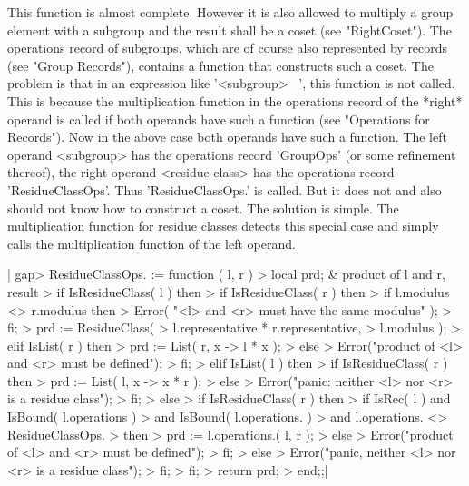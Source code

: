 This function is almost complete.  However it is also allowed to multiply
a group element  with a subgroup  and the result shall  be  a coset  (see
"RightCoset").  The operations  record  of subgroups, which are of course
also represented by records  (see "Group Records"),  contains  a function
that constructs such a coset.  The problem is that in  an expression like
'<subgroup> \*\ <residue-class>', this  function is not  called.  This is
because  the  multiplication function in   the  operations record  of the
*right* operand is   called if both   operands have such a function  (see
"Operations for Records").  Now in the above case both operands have such
a  function.   The   left operand   <subgroup> has  the operations record
'GroupOps'     (or   some    refinement    thereof),  the   right operand
<residue-class>   has the  operations   record 'ResidueClassOps'.    Thus
'ResidueClassOps.\*' is called.  But it does not and also should not know
how to construct a  coset.  The solution  is simple.   The multiplication
function for  residue classes detects this special  case and simply calls
the multiplication function of the left operand.

|    gap> ResidueClassOps.\* := function ( l, r )
    >     local   prd;        & product of l and r, result
    >     if IsResidueClass( l )  then
    >         if IsResidueClass( r )  then
    >             if l.modulus <> r.modulus  then
    >                 Error( "<l> and <r> must have the same modulus" );
    >             fi;
    >             prd := ResidueClass(
    >                         l.representative * r.representative,
    >                         l.modulus );
    >         elif IsList( r )  then
    >             prd := List( r, x -> l * x );
    >         else
    >             Error("product of <l> and <r> must be defined");
    >         fi;
    >     elif IsList( l )  then
    >         if IsResidueClass( r )  then
    >             prd := List( l, x -> x * r );
    >         else
    >             Error("panic: neither <l> nor <r> is a residue class");
    >         fi;
    >     else
    >         if IsResidueClass( r )  then
    >             if IsRec( l )  and IsBound( l.operations )
    >                 and IsBound( l.operations.\* )
    >                 and l.operations.\* <> ResidueClassOps.\*
    >             then
    >                 prd := l.operations.\*( l, r );
    >             else
    >                 Error("product of <l> and <r> must be defined");
    >             fi;
    >         else
    >             Error("panic, neither <l> nor <r> is a residue class");
    >         fi;
    >     fi;
    >     return prd;
    > end;;|

